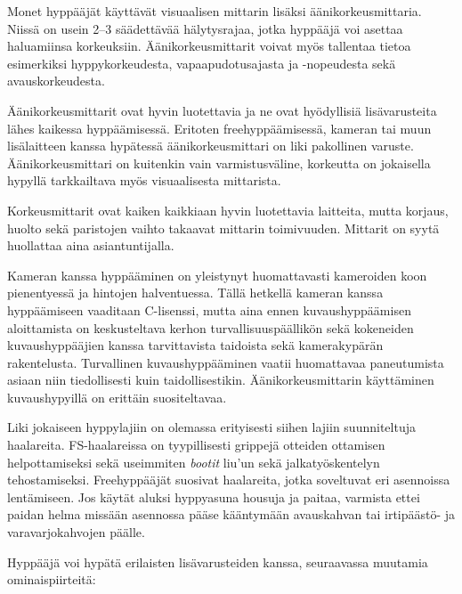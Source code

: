 Monet hyppääjät käyttävät visuaalisen mittarin lisäksi äänikorkeusmittaria. Niissä on usein 2–3 säädettävää hälytysrajaa, jotka hyppääjä voi asettaa haluamiinsa korkeuksiin. Äänikorkeusmittarit voivat myös tallentaa tietoa esimerkiksi hyppykorkeudesta, vapaapudotusajasta ja -nopeudesta sekä avauskorkeudesta. 


Äänikorkeusmittarit ovat hyvin luotettavia ja ne ovat hyödyllisiä lisävarusteita lähes kaikessa hyppäämisessä. Eritoten freehyppäämisessä, kameran tai muun lisälaitteen kanssa hypätessä äänikorkeusmittari on liki pakollinen varuste.  Äänikorkeusmittari on kuitenkin vain varmistusväline, korkeutta on jokaisella hypyllä tarkkailtava myös visuaalisesta mittarista.  


Korkeusmittarit ovat kaiken kaikkiaan hyvin luotettavia laitteita, mutta korjaus, huolto sekä paristojen vaihto takaavat mittarin toimivuuden. Mittarit on syytä huollattaa aina asiantuntijalla. 


Kameran kanssa hyppääminen on yleistynyt huomattavasti kameroiden koon pienentyessä ja hintojen halventuessa. Tällä hetkellä kameran kanssa hyppäämiseen vaaditaan C-lisenssi, mutta aina ennen kuvaushyppäämisen aloittamista on keskusteltava kerhon turvallisuuspäällikön sekä kokeneiden kuvaushyppääjien kanssa tarvittavista taidoista sekä kamerakypärän rakentelusta. Turvallinen kuvaushyppääminen vaatii huomattavaa paneutumista asiaan niin tiedollisesti kuin taidollisestikin. Äänikorkeusmittarin käyttäminen kuvaushypyillä on erittäin suositeltavaa. 


Liki jokaiseen hyppylajiin on olemassa erityisesti siihen lajiin suunniteltuja haalareita. FS-haalareissa on tyypillisesti grippejä otteiden ottamisen helpottamiseksi sekä useimmiten \textit{bootit} liu’un sekä jalkatyöskentelyn tehostamiseksi. Freehyppääjät suosivat haalareita, jotka soveltuvat eri asennoissa lentämiseen. Jos käytät aluksi hyppyasuna housuja ja paitaa, varmista ettei paidan helma missään asennossa pääse kääntymään avauskahvan tai irtipäästö- ja varavarjokahvojen päälle. 


Hyppääjä voi hypätä erilaisten lisävarusteiden kanssa, seuraavassa muutamia ominaispiirteitä: 

